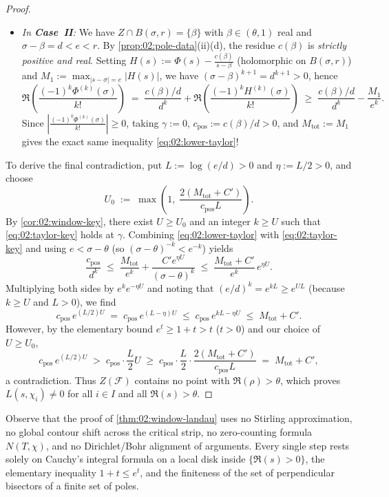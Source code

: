 \begin{proof}
\begin{itemize}
\item \emph{In \textbf{Case~II}:} We have $Z \cap B(\sigma, r) = \{\beta\}$ with $\beta \in (\theta, 1)$ real and $\sigma - \beta = d < e < r$. By \cref{prop:02:pole-data}(ii)(d), the residue $c(\beta)$ is \emph{strictly positive and real}. Setting $H(s) := \Phi(s) - \frac{c(\beta)}{s-\beta}$ (holomorphic on $B(\sigma, r)$) and $M_1 := \max_{|s-\sigma|=e} |H(s)|$, we have $(\sigma - \beta)^{k+1} = d^{k+1} > 0$, hence
  \[
    \Re\!\left(\frac{(-1)^k \Phi^{(k)}(\sigma)}{k!}\right)
    \;=\; \frac{c(\beta)/d}{d^k} + \Re\!\left(\frac{(-1)^k H^{(k)}(\sigma)}{k!}\right)
    \;\ge\; \frac{c(\beta)/d}{d^k} - \frac{M_1}{e^k}.
  \]
  Since $|\frac{(-1)^k \Phi^{(k)}(\sigma)}{k!}| \ge 0$, taking $\gamma := 0$, $c_{\mathrm{pos}} := c(\beta)/d > 0$, and $M_{\mathrm{tot}} := M_1$ gives the exact same inequality \eqref{eq:02:lower-taylor}!
\end{itemize}

To derive the final contradiction, put $L := \log(e / d) > 0$ and $\eta := L / 2 > 0$, and choose
\[
  U_0 \;:=\; \max\!\left(1,\; \frac{2(M_{\mathrm{tot}} + C')}{c_{\mathrm{pos}} L}\right).
\]
By \cref{cor:02:window-key}, there exist $U \ge U_0$ and an integer $k \ge U$ such that \eqref{eq:02:taylor-key} holds at $\gamma$. Combining \eqref{eq:02:lower-taylor} with \eqref{eq:02:taylor-key} and using $e < \sigma - \theta$ (so $(\sigma - \theta)^{-k} < e^{-k}$) yields
\[
  \frac{c_{\mathrm{pos}}}{d^k} \;\le\; \frac{M_{\mathrm{tot}}}{e^k} + \frac{C' e^{\eta U}}{(\sigma - \theta)^k}
  \;\le\; \frac{M_{\mathrm{tot}} + C'}{e^k}\, e^{\eta U}.
\]
Multiplying both sides by $e^k e^{-\eta U}$ and noting that $(e/d)^k = e^{k L} \ge e^{U L}$ (because $k \ge U$ and $L > 0$), we find
\[
  c_{\mathrm{pos}}\, e^{(L/2)U} \;=\; c_{\mathrm{pos}}\, e^{(L - \eta)U} \;\le\; c_{\mathrm{pos}}\, e^{kL - \eta U} \;\le\; M_{\mathrm{tot}} + C'.
\]
However, by the elementary bound $e^t \ge 1 + t > t$ ($t > 0$) and our choice of $U \ge U_0$,
\[
  c_{\mathrm{pos}}\, e^{(L/2)U} \;>\; c_{\mathrm{pos}} \cdot \frac{L}{2} U \;\ge\; c_{\mathrm{pos}} \cdot \frac{L}{2} \cdot \frac{2(M_{\mathrm{tot}} + C')}{c_{\mathrm{pos}} L} \;=\; M_{\mathrm{tot}} + C',
\]
a contradiction. Thus $Z(\mathcal{F})$ contains no point with $\Re(\rho) > \theta$, which proves $L(s, \chi_i) \neq 0$ for all $i \in I$ and all $\Re(s) > \theta$.
\end{proof}

\begin{remark}
Observe that the proof of \cref{thm:02:window-landau} uses no Stirling approximation, no global contour shift across the critical strip, no zero-counting formula $N(T, \chi)$, and no Dirichlet/Bohr alignment of arguments. Every single step rests solely on Cauchy's integral formula on a local disk inside $\{\Re(s) > 0\}$, the elementary inequality $1 + t \le e^t$, and the finiteness of the set of perpendicular bisectors of a finite set of poles.
\end{remark}
